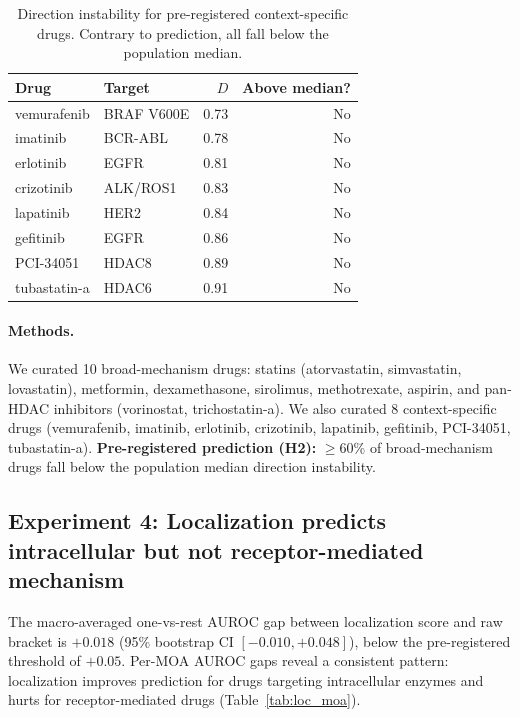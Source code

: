 \documentclass{article}
\begin{document}
\begin{table}[h]
\centering
\caption{Direction instability for pre-registered context-specific drugs.
Contrary to prediction, all fall below the population median.}
\label{tab:specific}
\small
\begin{tabular}{llrr}
\toprule
Drug & Target & $D$ & Above median? \\
\midrule
vemurafenib & BRAF V600E & 0.73 & No \\
imatinib & BCR-ABL & 0.78 & No \\
erlotinib & EGFR & 0.81 & No \\
crizotinib & ALK/ROS1 & 0.83 & No \\
lapatinib & HER2 & 0.84 & No \\
gefitinib & EGFR & 0.86 & No \\
PCI-34051 & HDAC8 & 0.89 & No \\
tubastatin-a & HDAC6 & 0.91 & No \\
\bottomrule
\end{tabular}
\end{table}

\paragraph{Methods.}
We curated 10 broad-mechanism drugs: statins (atorvastatin, simvastatin,
lovastatin), metformin, dexamethasone, sirolimus, methotrexate, aspirin,
and pan-HDAC inhibitors (vorinostat, trichostatin-a). We also curated 8
context-specific drugs (vemurafenib, imatinib, erlotinib, crizotinib,
lapatinib, gefitinib, PCI-34051, tubastatin-a).
\textbf{Pre-registered prediction (H2):} $\geq$60\% of broad-mechanism drugs
fall below the population median direction instability.

\subsection{Experiment 4: Localization predicts intracellular but not receptor-mediated mechanism}

The macro-averaged one-vs-rest AUROC gap between localization score and raw
bracket is $+0.018$ (95\% bootstrap CI $[-0.010, +0.048]$), below the
pre-registered threshold of $+0.05$. Per-MOA AUROC gaps reveal a consistent
pattern: localization improves prediction for drugs targeting intracellular
enzymes and hurts for receptor-mediated drugs (Table~\ref{tab:loc_moa}).
\end{document}
